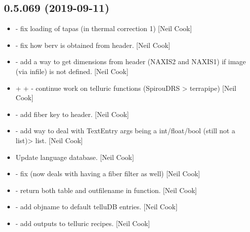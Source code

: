 \documentclass[a4paper,10pt,english]{report}
\begin{document}
\subsection{0.5.069 (2019-09-11)}
\label{\detokenize{misc/changelog:id74}}\begin{itemize}
\item {} 
 - fix loading of tapas (in thermal
correction 1) {[}Neil Cook{]}

\item {} 
 - fix how berv is obtained from header. {[}Neil
Cook{]}

\item {} 
 - add a way to get dimensions from header
(NAXIS2 and NAXIS1) if image (via infile) is not defined. {[}Neil Cook{]}

\item {} 
 +  +
 - continue work on telluric functions
(SpirouDRS \textendash{}\textgreater{} terrapipe) {[}Neil Cook{]}

\item {} 
 - add fiber key to header. {[}Neil
Cook{]}

\item {} 
 - add way to deal with TextEntry args being a
int/float/bool (still not a list)\textendash{}\textgreater{} list. {[}Neil Cook{]}

\item {} 
Update language database. {[}Neil Cook{]}

\item {} 
 - fix  (now deals with having a fiber filter
as well) {[}Neil Cook{]}

\item {} 
 - return both table and outfilename in 
function. {[}Neil Cook{]}

\item {} 
 - add objname to
default telluDB entries. {[}Neil Cook{]}

\item {} 
 - add outputs to
telluric recipes. {[}Neil Cook{]}


\end{itemize}
\end{document}
